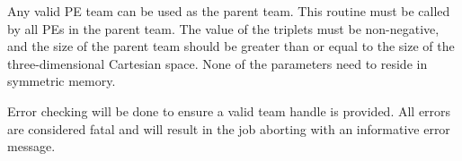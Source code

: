 \begin{apidefinition}
{Any valid \ac{PE} team can be used as the parent team. This routine must be
called by all \acp{PE} in the parent team. The value of the triplets must be
non-negative, and the size of the parent team should be greater than or
equal to the size of the three-dimensional Cartesian space. None of the
parameters need to reside in symmetric memory.

Error checking will be done to ensure a valid team handle is provided.
All errors are considered fatal and will result in the job aborting with
an informative error message.
}



\begin{apiexamples}

\end{apiexamples}

\end{apidefinition}

